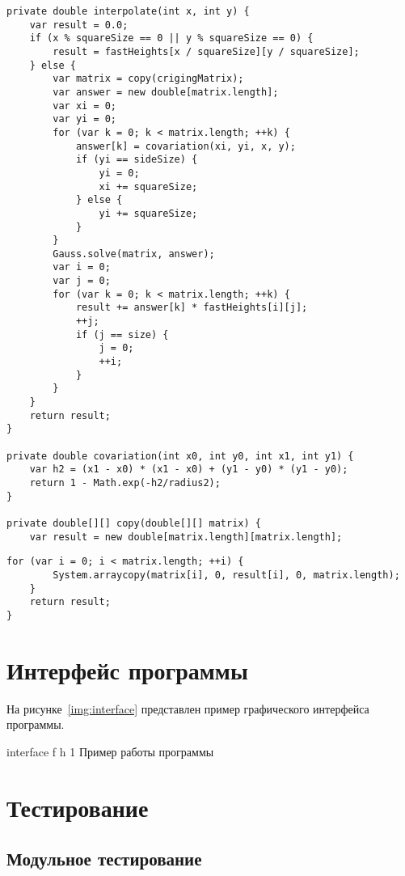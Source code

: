 \begin{lstlisting}[label=lst:gen3,caption=Реализация алгоритма генерации ландшафта (продолжение)]
private double interpolate(int x, int y) {
	var result = 0.0;
	if (x % squareSize == 0 || y % squareSize == 0) {
		result = fastHeights[x / squareSize][y / squareSize];
	} else {
		var matrix = copy(crigingMatrix);
		var answer = new double[matrix.length];
		var xi = 0;
		var yi = 0;
		for (var k = 0; k < matrix.length; ++k) {
			answer[k] = covariation(xi, yi, x, y);
			if (yi == sideSize) {
				yi = 0;
				xi += squareSize;
			} else {
				yi += squareSize;
			}
		}
		Gauss.solve(matrix, answer);
		var i = 0;
		var j = 0;
		for (var k = 0; k < matrix.length; ++k) {
			result += answer[k] * fastHeights[i][j];
			++j;
			if (j == size) {
				j = 0;
				++i;
			}
		}
	}
	return result;
}

private double covariation(int x0, int y0, int x1, int y1) {
	var h2 = (x1 - x0) * (x1 - x0) + (y1 - y0) * (y1 - y0);
	return 1 - Math.exp(-h2/radius2);
}

private double[][] copy(double[][] matrix) {
	var result = new double[matrix.length][matrix.length];
\end{lstlisting}

\begin{lstlisting}[label=lst:gen4,caption=Реализация алгоритма генерации ландшафта (окончание)]
		for (var i = 0; i < matrix.length; ++i) {
		System.arraycopy(matrix[i], 0, result[i], 0, matrix.length);
	}
	return result;
}
\end{lstlisting}

\section{Интерфейс программы}

На рисунке~\ref{img:interface} представлен пример графического интерфейса программы.

\FloatBarrier
{}
{interface} %
{f} %
{h} %
{1\textwidth} %
{Пример работы программы} %
\FloatBarrier

\section{Тестирование}

\subsection{Модульное тестирование}

